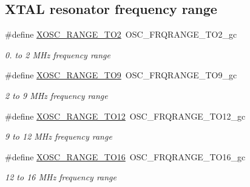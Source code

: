 \subsection*{X\-T\-A\-L resonator frequency range}
\begin{DoxyCompactItemize}
\item 
\hypertarget{group__osc__group_ga1b3dfb68bd57718e59d89893cff82105}{\#define \hyperlink{group__osc__group_ga1b3dfb68bd57718e59d89893cff82105}{X\-O\-S\-C\-\_\-\-R\-A\-N\-G\-E\-\_\-T\-O2}~O\-S\-C\-\_\-\-F\-R\-Q\-R\-A\-N\-G\-E\-\_\-T\-O2\-\_\-gc}\label{group__osc__group_ga1b3dfb68bd57718e59d89893cff82105}

\begin{DoxyCompactList}\small\item\em 0. to 2 M\-Hz frequency range \end{DoxyCompactList}\item 
\hypertarget{group__osc__group_gacad06261791ab0d0a65c30506cdb5a25}{\#define \hyperlink{group__osc__group_gacad06261791ab0d0a65c30506cdb5a25}{X\-O\-S\-C\-\_\-\-R\-A\-N\-G\-E\-\_\-T\-O9}~O\-S\-C\-\_\-\-F\-R\-Q\-R\-A\-N\-G\-E\-\_\-T\-O9\-\_\-gc}\label{group__osc__group_gacad06261791ab0d0a65c30506cdb5a25}

\begin{DoxyCompactList}\small\item\em 2 to 9 M\-Hz frequency range \end{DoxyCompactList}\item 
\hypertarget{group__osc__group_gadcdcd84c4cd10eae717b0d139a982cb7}{\#define \hyperlink{group__osc__group_gadcdcd84c4cd10eae717b0d139a982cb7}{X\-O\-S\-C\-\_\-\-R\-A\-N\-G\-E\-\_\-T\-O12}~O\-S\-C\-\_\-\-F\-R\-Q\-R\-A\-N\-G\-E\-\_\-T\-O12\-\_\-gc}\label{group__osc__group_gadcdcd84c4cd10eae717b0d139a982cb7}

\begin{DoxyCompactList}\small\item\em 9 to 12 M\-Hz frequency range \end{DoxyCompactList}\item 
\hypertarget{group__osc__group_gaa1a075ed343b8974cd5092e67b1a6390}{\#define \hyperlink{group__osc__group_gaa1a075ed343b8974cd5092e67b1a6390}{X\-O\-S\-C\-\_\-\-R\-A\-N\-G\-E\-\_\-T\-O16}~O\-S\-C\-\_\-\-F\-R\-Q\-R\-A\-N\-G\-E\-\_\-T\-O16\-\_\-gc}\label{group__osc__group_gaa1a075ed343b8974cd5092e67b1a6390}

\begin{DoxyCompactList}\small\item\em 12 to 16 M\-Hz frequency range \end{DoxyCompactList}\end{DoxyCompactItemize}


